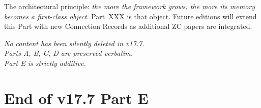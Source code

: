 \documentclass[12pt, a4paper]{article}
\begin{document}
The architectural principle: \emph{the more the framework grows,
the more its memory becomes a first-class object}. Part~XXX is
that object. Future editions will extend this Part with new
Connection Records as additional ZC papers are integrated.

\bigskip

\begin{center}
\textit{No content has been silently deleted in v17.7.}\\
\textit{Parts A, B, C, D are preserved verbatim.}\\
\textit{Part E is strictly additive.}
\end{center}


\section*{End of v17.7 Part E}
\end{document}
